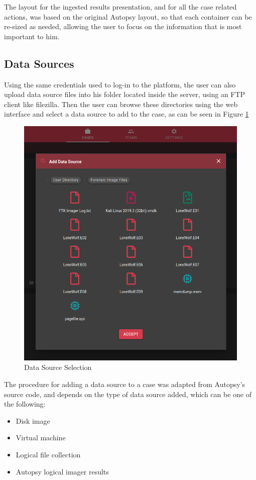 The layout for the ingested results presentation, and for all the case related actions, was based on the original Autopsy layout, so that each container can be re-sized as
needed, allowing the user to focus on the information that is most important to him.

\subsection{Data Sources}

Using the same credentials used to log-in to the platform, the user can also upload data source files into his folder located inside the server, using an FTP client like filezilla.
Then the user can browse these directories using the web interface and select a data source to add to the case, as can be seen in Figure \ref{fig:datasource}

\begin{figure}[ht]
 \centering
 \includegraphics[width=0.75\linewidth]{imgs/data-sources.png}
 \caption{Data Source Selection}
 \label{fig:datasource}
\end{figure}

The procedure for adding a data source to a case was adapted from Autopsy's source code, and depends on the type of data source added, which can be one of the following:
\begin{itemize}
 \item Disk image
 \item Virtual machine
 \item Logical file collection
 \item Autopsy logical imager results
\end{itemize}


